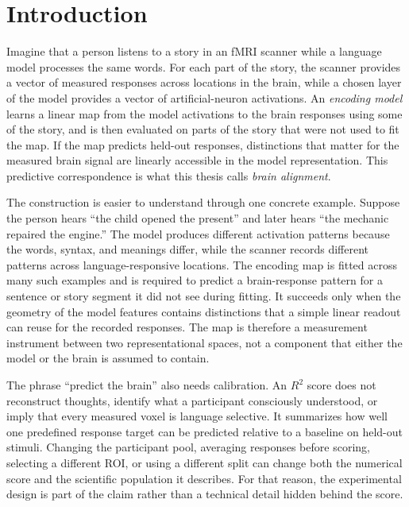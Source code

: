 \section{Introduction}

Imagine that a person listens to a story in an fMRI scanner while a language model processes the same words.
For each part of the story, the scanner provides a vector of measured responses across locations in the brain, while a chosen layer of the model provides a vector of artificial-neuron activations.
An \emph{encoding model} learns a linear map from the model activations to the brain responses using some of the story, and is then evaluated on parts of the story that were not used to fit the map.
If the map predicts held-out responses, distinctions that matter for the measured brain signal are linearly accessible in the model representation.
This predictive correspondence is what this thesis calls \emph{brain alignment}.

The construction is easier to understand through one concrete example.
Suppose the person hears ``the child opened the present'' and later hears ``the mechanic repaired the engine.''
The model produces different activation patterns because the words, syntax, and meanings differ, while the scanner records different patterns across language-responsive locations.
The encoding map is fitted across many such examples and is required to predict a brain-response pattern for a sentence or story segment it did not see during fitting.
It succeeds only when the geometry of the model features contains distinctions that a simple linear readout can reuse for the recorded responses.
The map is therefore a measurement instrument between two representational spaces, not a component that either the model or the brain is assumed to contain.

The phrase ``predict the brain'' also needs calibration.
An $R^2$ score does not reconstruct thoughts, identify what a participant consciously understood, or imply that every measured voxel is language selective.
It summarizes how well one predefined response target can be predicted relative to a baseline on held-out stimuli.
Changing the participant pool, averaging responses before scoring, selecting a different ROI, or using a different split can change both the numerical score and the scientific population it describes.
For that reason, the experimental design is part of the claim rather than a technical detail hidden behind the score.

